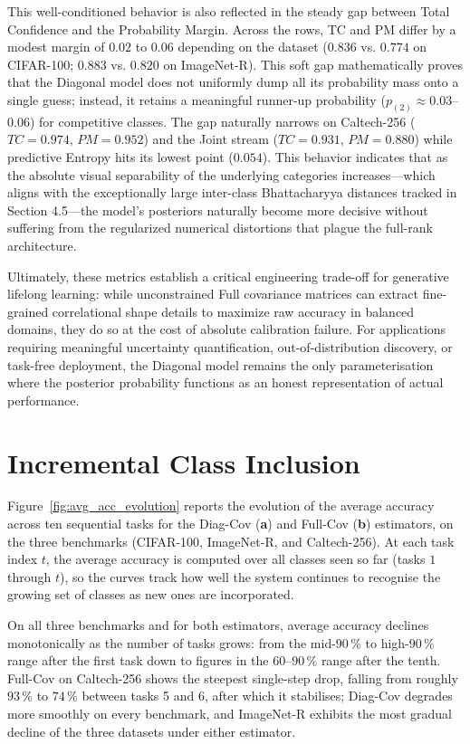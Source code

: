 This well-conditioned behavior is also reflected in the steady gap between Total Confidence and the Probability Margin. Across the rows, TC and PM differ by a modest margin of $0.02$ to $0.06$ depending on the dataset ($0.836$ vs. $0.774$ on CIFAR-100; $0.883$ vs. $0.820$ on ImageNet-R). This soft gap mathematically proves that the Diagonal model does not uniformly dump all its probability mass onto a single guess; instead, it retains a meaningful runner-up probability ($p_{(2)} \approx 0.03$--$0.06$) for competitive classes. The gap naturally narrows on Caltech-256 ($TC=0.974$, $PM=0.952$) and the Joint stream ($TC=0.931$, $PM=0.880$) while predictive Entropy hits its lowest point ($0.054$). This behavior indicates that as the absolute visual separability of the underlying categories increases—which aligns with the exceptionally large inter-class Bhattacharyya distances tracked in Section 4.5—the model's posteriors naturally become more decisive without suffering from the regularized numerical distortions that plague the full-rank architecture.

Ultimately, these metrics establish a critical engineering trade-off for generative lifelong learning: while unconstrained Full covariance matrices can extract fine-grained correlational shape details to maximize raw accuracy in balanced domains, they do so at the cost of absolute calibration failure. For applications requiring meaningful uncertainty quantification, out-of-distribution discovery, or task-free deployment, the Diagonal model remains the only parameterisation where the posterior probability functions as an honest representation of actual performance.

\section{Incremental Class Inclusion}
\label{sec:incremental_update}

Figure~\ref{fig:avg_acc_evolution} reports the evolution of the average accuracy across ten sequential tasks for the Diag-Cov (\textbf{a}) and Full-Cov (\textbf{b}) estimators, on the three benchmarks (CIFAR-100, ImageNet-R, and Caltech-256). At each task index $t$, the average accuracy is computed over all classes seen so far (tasks $1$ through $t$), so the curves track how well the system continues to recognise the growing set of classes as new ones are incorporated.

On all three benchmarks and for both estimators, average accuracy declines monotonically as the number of tasks grows: from the mid-$90\,\%$ to high-$90\,\%$ range after the first task down to figures in the $60$--$90\,\%$ range after the tenth. Full-Cov on Caltech-256 shows the steepest single-step drop, falling from roughly $93\,\%$ to $74\,\%$ between tasks 5 and 6, after which it stabilises; Diag-Cov degrades more smoothly on every benchmark, and ImageNet-R exhibits the most gradual decline of the three datasets under either estimator.

